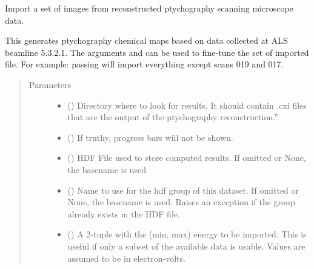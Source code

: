 \documentclass[letterpaper,10pt,english]{sphinxmanual}
\begin{document}
\begin{fulllineitems}
\label{\detokenize{xanespy:xanespy.importers.import_nanosurveyor_frameset}}
Import a set of images from reconstructed ptychography scanning microscope data.

This generates ptychography chemical maps based on data collected
at ALS beamline 5.3.2.1. The arguments  and
 can be used to fine-tune the set of imported
file. For example: passing  will import
everything except scans 019 and 017.
\begin{quote}\begin{description}
\item[{Parameters}] \leavevmode\begin{itemize}
\item {} 
 () \textendash{} Directory where to look for results. It should contain .cxi
files that are the output of the ptychography reconstruction.”

\item {} 
 (\sphinxstyleliteralemphasis{, }) \textendash{} If truthy, progress bars will not be shown.

\item {} 
 (\sphinxstyleliteralemphasis{, }) \textendash{} HDF File used to store computed results. If omitted or None, the
 basename is used

\item {} 
 (\sphinxstyleliteralemphasis{, }) \textendash{} Name to use for the hdf group of this dataset. If omitted or
None, the  basename is used. Raises an exception if
the group already exists in the HDF file.

\item {} 
 (\sphinxstyleliteralemphasis{, }) \textendash{} A 2-tuple with the (min, max) energy to be imported. This is
useful if only a subset of the available data is usable. Values
are assumed to be in electron-volts.


\end{itemize}
\end{description}
\end{quote}
\end{fulllineitems}
\end{document}
